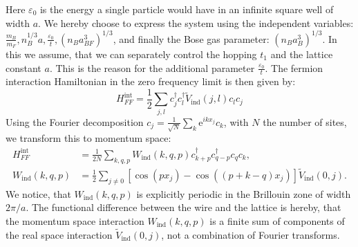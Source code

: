 Here $\varepsilon_0$ is the energy a single particle would have in an infinite square well of width $a$. We hereby choose to express the system using the independent variables: $\frac{m_B}{m_F}, n_B^{1/3}a, \frac{\varepsilon_0}{t}, \left(n_B a^3_{BF}\right)^{1 / 3}$, and finally the Bose gas parameter: $\left(n_B a^3_{B}\right)^{1 / 3}$. In this we assume, that we can separately control the hopping $t_1$ and the lattice constant $a$. This is the reason for the additional parameter $\frac{\varepsilon_0}{t}$. The fermion interaction Hamiltonian in the zero frequency limit is then given by:
\begin{equation}
H^{\text{int}}_{FF} = \frac{1}{2}\sum_{j,l} c^\dagger_j c^\dagger_l \tilde{V}_{\text{ind}}(j, l) c_l c_j
\label{eq.Hintrealspace.lattice}
\end{equation}
Using the Fourier decomposition $c_j = \frac{1}{\sqrt{N}}\sum_k \text{e}^{ikx_j}c_k$, with $N$ the number of sites, we transform this to momentum space:
\begin{align}
H^{\text{int}}_{FF} &= \frac{1}{2N} \sum_{k, q, p} W_{\text{ind}}(k, q, p) c^\dagger_{k + p} c^\dagger_{q - p} c_q c_k, \nonumber \\  
W_{\text{ind}}(k, q, p) &= \frac{1}{2}\sum_{j\neq 0} \left[\cos(px_j) - \cos((p + k - q)x_j) \right]\tilde{V}_{\text{ind}}(0, j). 
\label{eq.Hintmomentumspace.lattice}
\end{align}
We notice, that $W_{\text{ind}}(k, q, p)$ is explicitly periodic in the Brillouin zone of width $2\pi / a$. The functional difference between the wire and the lattice is hereby, that the momentum space interaction $W_{\text{ind}}(k, q, p)$ is a finite sum of components of the real space interaction $\tilde{V}_{\text{ind}}(0, j)$, not a combination of Fourier transforms. 

